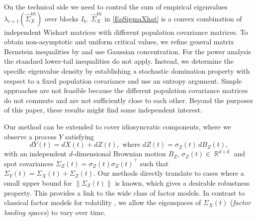 \documentclass[preprint,aos]{imsart}
\numberwithin{equation}{section}
\theoremstyle{remark}
\DeclareMathOperator{\R}{{\mathbb R}}
\providecommand{\norm}[1]{\lVert #1 \rVert}
\begin{document}
On the technical side we need to control the sum of empirical eigenvalues $\lambda_{r+1}(\hat\Sigma_X^{kh})$ over blocks $I_k$. $\hat\Sigma_X^{kh}$ in \eqref{EqSigmaXhat} is a convex combination of independent Wishart matrices with different population covariance matrices. To obtain non-asymptotic and uniform critical values, we refine general matrix Bernstein inequalities by \citet{tropp2012} and use Gaussian concentration. For the power analysis the standard lower-tail inequalities do not apply. Instead, we determine the specific eigenvalue density by establishing a stochastic domination property with respect to a fixed population covariance and use an entropy argument. Simple approaches are not feasible because the different population covariance matrices do not commute and are not sufficiently close to each other. Beyond the purposes of this paper, these results might find some independent interest.

Our method can be extended to cover idiosyncratic components, where we observe a process $Y$ satisfying
\begin{equation}\label{EqY}
 dY(t)=dX(t)+dZ(t),\text{ where } dZ(t)=\sigma_Z(t)\,dB_Z(t),
 \end{equation}
 with an independent $d$-dimensional Brownian motion $B_Z$, $\sigma_Z(t)\in\R^{d\times d}$ and spot covariances $\Sigma_Z(t)=\sigma_Z(t)\sigma_Z(t)^\top$ such that $\Sigma_Y(t)=\Sigma_X(t)+\Sigma_Z(t)$. Our methods directly translate to cases where a small upper bound for $\norm{\Sigma_Z(t)}$ is known, which gives a desirable robustness property.
 This provides a link to the wide class of factor models. In contrast to classical factor models for volatility \citep{LiYao2016,ait2017}, we allow the eigenspaces of $\Sigma_X(t)$ ({\it factor loading spaces}) to vary over time. %
\end{document}
